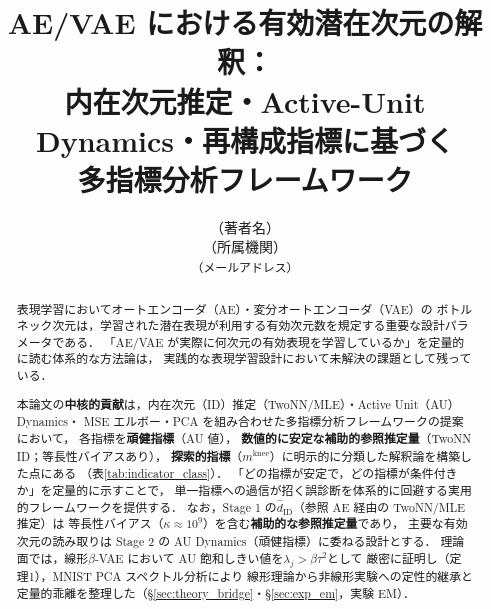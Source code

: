 \documentclass[11pt,a4paper]{jsarticle}
\title{AE/VAE における有効潜在次元の解釈：\\
       内在次元推定・Active-Unit Dynamics・再構成指標に基づく\\
       多指標分析フレームワーク}
\author{（著者名）\\
{\small （所属機関）}\\
{\small \texttt{（メールアドレス）}}}
\date{}
\newcommand{\kap}{\kappa}
\newcommand{\mknee}{m^{\mathrm{knee}}}
\begin{document}
\maketitle

\begin{abstract}
表現学習においてオートエンコーダ（AE）・変分オートエンコーダ（VAE）の
ボトルネック次元は，学習された潜在表現が利用する有効次元数を規定する重要な設計パラメータである．
「AE/VAE が実際に何次元の有効表現を学習しているか」を定量的に読む体系的な方法論は，
実践的な表現学習設計において未解決の課題として残っている．

本論文の\textbf{中核的貢献}は，内在次元（ID）推定（TwoNN/MLE）・Active Unit（AU）Dynamics・
MSE エルボー・PCA を組み合わせた多指標分析フレームワークの提案において，
各指標を\textbf{頑健指標}（AU 値），
\textbf{数値的に安定な補助的参照推定量}（TwoNN ID；等長性バイアスあり），
\textbf{探索的指標}（$\mknee$）に明示的に分類した解釈論を構築した点にある
（表\ref{tab:indicator_class}）．
「どの指標が安定で，どの指標が条件付きか」を定量的に示すことで，
単一指標への過信が招く誤診断を体系的に回避する実用的フレームワークを提供する．
なお，Stage 1 の$\hat{d}_\mathrm{ID}$（参照 AE 経由の TwoNN/MLE 推定）は
等長性バイアス（$\kap \approx 10^9$）を含む\textbf{補助的な参照推定量}であり，
主要な有効次元の読み取りは Stage 2 の AU Dynamics（頑健指標）に委ねる設計とする．
理論面では，線形$\beta$-VAE において AU 飽和しきい値を$\lambda_j > \beta\tau^2$として
厳密に証明し（定理1），MNIST PCA スペクトル分析により
線形理論から非線形実験への定性的継承と定量的乖離を整理した（§\ref{sec:theory_bridge}・§\ref{sec:exp_em}，実験 EM）．


\end{abstract}
\end{document}
